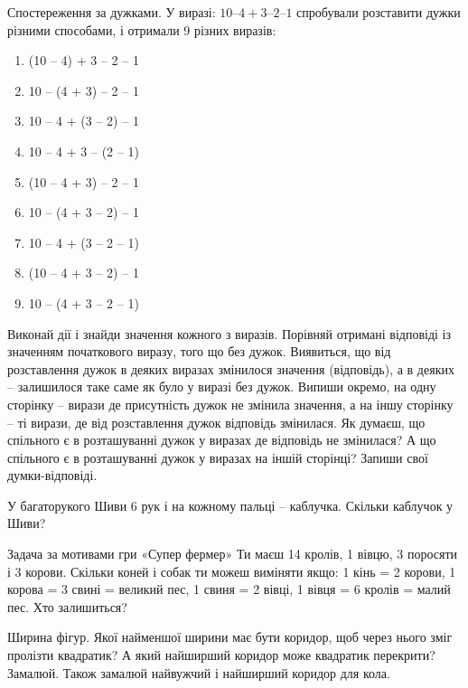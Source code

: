 \problem
Спостереження за дужками.
У виразі: $10 – 4 + 3 – 2 – 1$ спробували розставити дужки різними способами,
і отримали 9 різних виразів:
\begin{multicols}{2}
    \begin{enumerate}
        \item (10 – 4) + 3 – 2 – 1
        \item 10 – (4 + 3) – 2 – 1
        \item 10 – 4 + (3 – 2) – 1
        \item 10 – 4 + 3 – (2 – 1)
        \item (10 – 4 + 3) – 2 – 1
        \item 10 – (4 + 3 – 2) – 1
        \item 10 – 4 + (3 – 2 – 1)
        \item (10 – 4 + 3 – 2) – 1
        \item 10 – (4 + 3 – 2 – 1)
    \end{enumerate}
\end{multicols}
Виконай дії і знайди значення кожного з виразів.
Порівняй отримані відповіді із значенням початкового виразу,
того що без дужок.
Виявиться, що від розставлення дужок в деяких виразах змінилося
значення (відповідь), а в деяких – залишилося таке саме
як було у виразі без дужок.
Випиши окремо, на одну сторінку – вирази де присутність дужок
не змінила значення, а на іншу сторінку – ті вирази,
де від розставлення дужок відповідь змінилася.
Як думаєш, що спільного є в розташуванні дужок у виразах
де відповідь не змінилася?
А що спільного є в розташуванні дужок у виразах на іншій сторінці?
Запиши свої думки-відповіді.


\problem
У багаторукого Шиви 6 рук і на кожному пальці – каблучка.
Скільки каблучок у Шиви?


\problem
Задача за мотивами гри «Супер фермер»
Ти маєш 14 кролів, 1 вівцю, 3 поросяти і 3 корови. 
Скільки коней і собак ти можеш виміняти якщо: 
1 кінь = 2 корови, 
1 корова = 3 свині = великий пес, 
1 свиня = 2 вівці, 
1 вівця = 6 кролів = малий пес. 
Хто залишиться?


\problem
Ширина фігур.
Якої найменшої ширини має бути коридор,
щоб через нього зміг пролізти квадратик?
А який найширший коридор може квадратик перекрити?
Замалюй. Також замалюй найвужчий і найширший коридор для кола.


